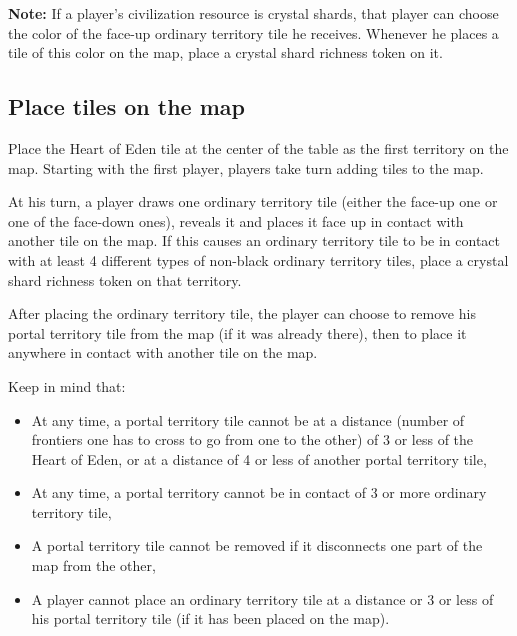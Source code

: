 \documentclass[a4paper]{article}
\begin{document}
        \textbf{Note:} If a player's civilization resource is crystal shards,
        that player can choose the color of the face-up ordinary territory tile
        he receives.
        Whenever he places a tile of this color on the map,
        place a crystal shard richness token on it.
      
    \subsection{Place tiles on the map}
        \label{map-tiles}
        Place the Heart of Eden tile at the center of the table as the first
        territory on the map.
        Starting with the first player, players take turn adding tiles to the map.
        
        At his turn, a player draws one ordinary territory tile
        (either the face-up one or one of the face-down ones),
        reveals it and places it face up in contact with another tile on the map.
        If this causes an ordinary territory tile to be in contact with at least
        4 different types of non-black ordinary territory tiles,
        place a crystal shard richness token on that territory.
        
        After placing the ordinary territory tile,
        the player can choose to remove his portal territory tile from the map
        (if it was already there),
        then to place it anywhere in contact with another tile on the map.
        
\newpage
        Keep in mind that:
        \vspace{-1.3em}
        \begin{itemize}
            \item At any time, a portal territory tile cannot be at a distance
                (number of frontiers one has to cross to go from one to the other)
                of 3 or less of the Heart of Eden,
                or at a distance of 4 or less of another portal territory tile,
            \item At any time, a portal territory cannot be in contact of 3 or more
                ordinary territory tile,
            \item A portal territory tile cannot be removed
                if it disconnects one part of the map from the other,
            \item A player cannot place an ordinary territory tile at a distance
                or 3 or less of his portal territory tile (if it has been placed on the map).
        \end{itemize}
        
\end{document}
